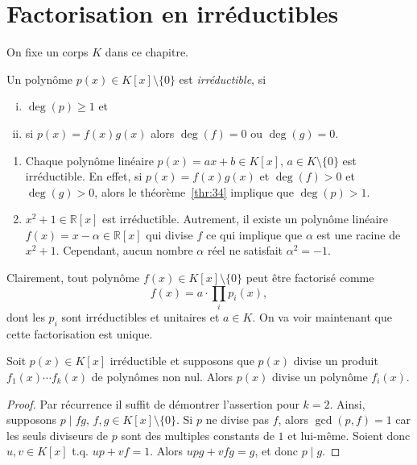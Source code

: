 \section{Factorisation en irréductibles}
\label{sec:fact-en-irred}

On fixe un corps $K$ dans ce chapitre. 

\begin{definition}
  \label{def:53}
  Un polynôme $p(x) ∈ K[x] \setminus \{0\}$ est \emph{irréductible}, si
  \begin{enumerate}[i)]
  \item $\deg(p) ≥1$ et
  \item  si $p(x) = f(x) g(x)$ alors $\deg(f) = 0$ ou $\deg(g) = 0$. 
  \end{enumerate}
\end{definition}

\begin{example}
  \label{exe:46}
  \begin{enumerate}
  \item   Chaque polynôme linéaire $p(x) = ax + b ∈ K[x]$, $a ∈ K \setminus\{0\}$ est irréductible. En effet, si $p(x) = f(x) g(x)$ et $\deg(f)>0$ et $\deg(g)>0$, alors le théorème~\ref{thr:34} implique que $\deg(p) >1$.
  \item $x^2 +1 ∈ℝ[x]$ est irréductible. Autrement, il existe un polynôme linéaire $f(x) =  x - α ∈ ℝ[x]$ qui divise $f$ ce qui implique que $α$ est une racine de $x^2 +1$. Cependant, aucun nombre $α$ réel ne satisfait $α^2 = -1$.
  \end{enumerate}
\end{example}


Clairement, tout polynôme $f(x) ∈ K[x] \setminus \{0\}$    peut être factorisé comme
\begin{equation}
  \label{eq:33}
  f(x) = a ⋅ ∏_i p_i(x),
\end{equation}
dont les $p_i$ sont irréductibles et unitaires et $a ∈ K$. On va voir maintenant que cette factorisation est unique. 

\begin{theorem}
\label{thr:56}
  Soit $p(x) ∈K[x]$ irréductible et supposons que $p(x)$ divise un produit $f_1(x) \cdots f_k(x)$ de polynômes non nul. Alors $p(x)$ divise un polynôme $f_i(x)$. 
\end{theorem}


\begin{proof}
  Par récurrence il suffit de démontrer l'assertion pour $k=2$. Ainsi, supposons $p \mid fg$, $f,g ∈K[x] \setminus \{0\}$. Si $p$ ne divise pas $f$, alors $\gcd(p,f) = 1$ car les seuls diviseurs de $p$ sont des multiples constants de $1$ et lui-même. Soient donc $u,v ∈ K[x]$ t.q.  $up + vf = 1$. Alors $upg + vfg = g$, et donc $p \mid g$. 
\end{proof}


